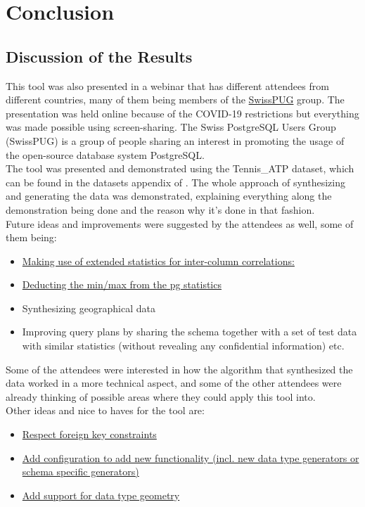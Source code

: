\chapter{Conclusion}

\section{Discussion of the Results}
This tool was also presented in a webinar that has different attendees from different countries, many of them being members of the \href{https://www.swisspug.org/wiki/index.php/Swiss_PostgreSQL_Users_Group}{SwissPUG} group. The presentation was held online because of the COVID-19 restrictions but everything was made possible using screen-sharing.
The Swiss PostgreSQL Users Group (SwissPUG) is a group of people sharing an interest in promoting the usage of the open-source database system PostgreSQL. \cite{SwissPUGWiki} \\
\newline
The tool was presented and demonstrated using the Tennis\_ATP dataset, which can be found in the datasets appendix of . The whole approach of synthesizing and generating the data was demonstrated, explaining everything along the demonstration being done and the reason why it's done in that fashion.\\
\newline
Future ideas and improvements were suggested by the attendees as well, some of them being:
\begin{itemize}
\item{\href{https://gitlab.com/labiangashi/pgsynthdata/-/issues/7}{Making use of extended statistics for inter-column correlations:}}
\item{\href{https://gitlab.com/labiangashi/pgsynthdata/-/issues/8}{Deducting the min/max from the pg statistics}}
\item{Synthesizing geographical data}
\item{Improving query plans by sharing the schema together with a set of test data with similar statistics (without revealing any confidential information) etc.}
\end{itemize}
Some of the attendees were interested in how the algorithm that synthesized the data worked in a more technical aspect, and some of the other attendees were already thinking of possible areas where they could apply this tool into.\\
\newline
Other ideas and nice to haves for the tool are:
\begin{itemize}
\item{\href{https://gitlab.com/labiangashi/pgsynthdata/-/issues/4}{Respect foreign key constraints}}
\item{\href{https://gitlab.com/labiangashi/pgsynthdata/-/issues/5}{Add configuration to add new functionality (incl. new data type generators or schema specific generators)}}
\item{\href{https://gitlab.com/labiangashi/pgsynthdata/-/issues/6}{Add support for data type geometry}}
\end{itemize}
